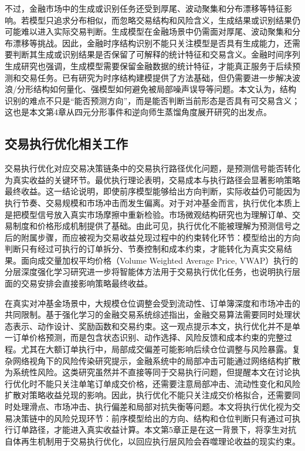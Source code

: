 不过，金融市场中的生成或识别任务还受到厚尾、波动聚集和分布漂移等特征影响。若模型只追求分布相似，而忽略交易结构和风险含义，生成结果或识别结果仍可能难以进入实际交易判断。生成模型在金融场景中仍需面对厚尾、波动聚集和分布漂移等挑战\cite{kwon2021gans}。因此，金融时序结构识别不能只关注模型是否具有生成能力，还需要判断其生成或识别结果是否保留了可解释的统计特征和交易含义。金融时间序列生成研究也强调，生成模型需要保留金融数据的统计特征，才能真正服务于后续预测和交易任务\cite{takahashi2019modeling}。已有研究为时序结构建模提供了方法基础，但仍需要进一步解决波浪/分形结构如何量化、强模型如何避免被局部噪声误导等问题。本文认为，结构识别的难点不只是“能否预测方向”，而是能否判断当前形态是否具有可交易含义；这也是本文第4章从四元分形事件和逆向师生蒸馏角度展开研究的出发点。

\subsection{交易执行优化相关工作}
交易执行优化对应交易决策链条中的交易执行路径优化问题，是预测信号能否转化为真实收益的关键环节。最优执行理论表明，交易成本与执行路径会显著影响策略最终收益\cite{almgren2001optimal}。这一结论说明，即使前序模型能够给出方向判断，实际收益仍可能因为执行节奏、交易规模和市场冲击而发生偏离。对于对冲基金而言，执行优化本质上是把模型信号放入真实市场摩擦中重新检验。市场微观结构研究也为理解订单、交易制度和价格形成机制提供了基础\cite{2011Empirical}。由此可见，执行优化不能被理解为预测信号之后的附属步骤，而应被视为交易收益兑现过程中的约束转化环节：模型给出的方向判断只有经过可执行的订单拆分、节奏控制和成本约束，才能转化为真实交易结果。面向成交量加权平均价格（Volume Weighted Average Price, VWAP）执行的分层深度强化学习研究进一步将智能体方法用于交易执行优化任务\cite{li2023hierarchical}，也说明执行层面的交易安排会直接影响策略最终收益。

在真实对冲基金场景中，大规模仓位调整会受到流动性、订单簿深度和市场冲击的共同限制。基于强化学习的金融交易系统综述指出，金融交易算法需要同时处理状态表示、动作设计、奖励函数和交易约束\cite{liang2019survey}。这一观点提示本文，执行优化并不是单一订单价格预测，而是包含状态识别、动作选择、风险反馈和成本约束的完整过程。尤其在大额订单执行中，局部成交偏差可能影响后续仓位调整与风险暴露。复杂网络视角下的风险传染研究提示，金融系统中的局部冲击可能通过网络结构扩散为系统性风险\cite{zeng2022network}。这类研究虽然并不直接等同于交易执行问题，但提醒本文在讨论执行优化时不能只关注单笔订单成交价格，还需要注意局部冲击、流动性变化和风险扩散对策略收益兑现的影响。因此，执行优化不能只关注成交价格拟合，还需要同时处理滑点、市场冲击、执行偏差和局部对抗失衡等问题。本文将执行优化视为交易决策链中的风险兑现环节：前序模型给出的方向、结构和仓位判断只有通过可执行订单路径，才能进入真实收益计算。本文第5章正是在这一背景下，将孪生对抗自体再生机制用于交易执行优化，以回应执行层风险会吞噬理论收益的现实约束。

